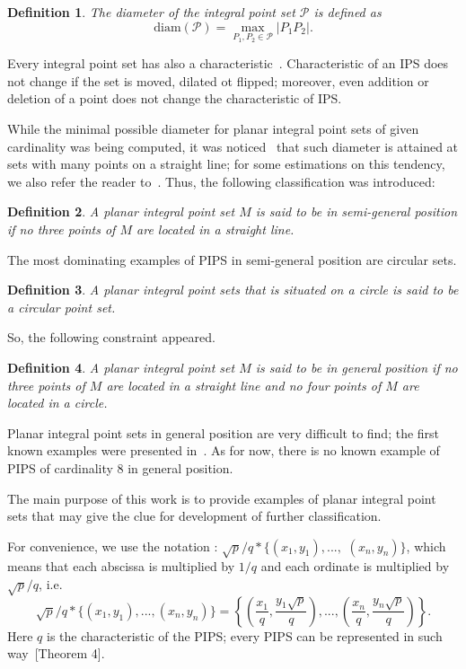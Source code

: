 \documentclass[12pt]{article}
\theoremstyle{theorem}
\theoremstyle{dfn}
\newtheorem{dfn}{Definition}
\theoremstyle{remark}
\begin{document}
\begin{dfn}
	The diameter of the integral point set $\mathcal{P}$ is defined as
	\begin{equation}
		\operatorname{diam(\mathcal{P})} = \underset{P_{1}, P_{2} \in
		\mathcal{P}}{\max} |P_{1}P_{2}|
		.
	\end{equation}
\end{dfn}

Every integral point set has also a characteristic~\cite{kemnitz1988punktmengen,kurz2005characteristic}.
Characteristic of an IPS does not change if the set is moved, dilated ot flipped;
moreover, even addition or deletion of a point does not change the characteristic of IPS.


While the minimal possible diameter for planar integral point sets of given cardinality was being computed,
it was noticed~\cite{kurz2008minimum} that such diameter is attained at sets with many points on a straight line;
for some estimations on this tendency, we also refer the reader to~\cite{solymosi2003note}.
Thus, the following classification was introduced:
\begin{dfn}
	A planar integral point set $M$ is said to be in \emph{semi-general position}
	if no three points of $M$ are located in a straight line.
\end{dfn}

The most dominating examples of PIPS in semi-general position are circular sets.
\begin{dfn}
	A planar integral point sets that is situated on a circle is said to be a \textit{circular}
	point set.
\end{dfn}

So, the following constraint appeared.
\begin{dfn}
	A planar integral point set $M$ is said to be in \emph{general position}
	if no three points of $M$ are located in a straight line
	and no four points of $M$ are located in a circle.
\end{dfn}

Planar integral point sets in general position are very difficult to find;
the first known examples were presented in~\cite{kreisel2008heptagon}.
As for now, there is no known example of PIPS of cardinality 8 in general position.

The main purpose of this work is to provide examples of planar integral point sets
that may give the clue for development of further classification.

For convenience, we use the notation \cite{our-ped-2018,our-pmm-2018,our-vmmsh-2018}:
$\sqrt{p}/q * \{ (x_1,y_1), ...,$ $ (x_n, y_n)  \}$,
which means that each abscissa is multiplied by $1/q$
and each ordinate is multiplied by $\sqrt{p}/q$,  i.e.
\begin{equation}
	\label{eq:char_lattice}
	\sqrt{p}/q * \{ (x_1,y_1), ..., (x_n, y_n)  \}
	=
	\left\{ \left(\frac{x_1}{q},\frac{y_1\sqrt{p}}{q}\right), ..., \left(\frac{x_n}{q},   \frac{y_n\sqrt{p}}{q}\right)  \right\}
	.
\end{equation}
Here $q$ is the characteristic of the PIPS;
every PIPS can be represented in such way~\cite{our-vmmsh-2018-translit}[Theorem 4].
\end{document}
